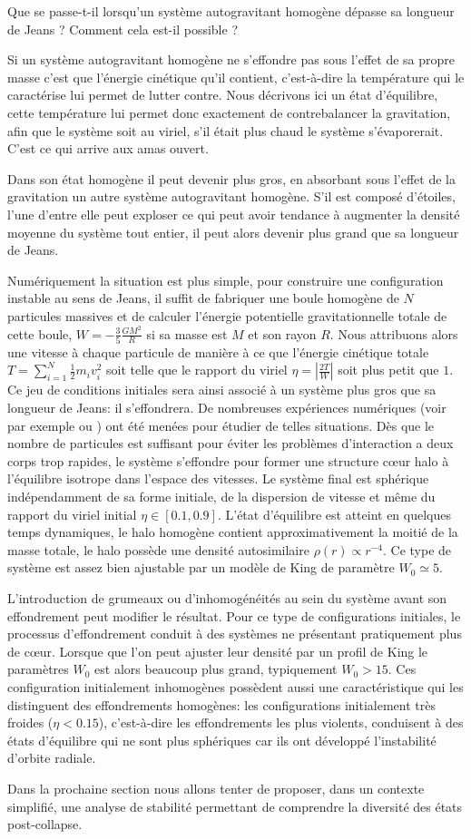 Que se passe-t-il lorsqu'un système autogravitant homogène dépasse sa longueur de Jeans ?
Comment cela est-il possible ?

Si un système autogravitant homogène ne s'effondre pas sous l'effet de sa propre masse c'est que l'énergie cinétique qu'il contient, c'est-à-dire la
température qui le caractérise lui permet de lutter contre. Nous décrivons ici un état d'équilibre, cette température lui permet
donc exactement de contrebalancer la gravitation, afin que le système soit \og au viriel\fg, s'il était plus chaud le système s'évaporerait.
C'est ce qui arrive aux amas ouvert.

Dans son état homogène il peut devenir plus gros, en absorbant sous l'effet de la gravitation un autre système autogravitant homogène. S'il est
composé d'étoiles, l'une d'entre elle peut exploser ce qui peut avoir tendance à augmenter la densité moyenne du système tout entier, il peut alors
devenir plus grand que sa longueur de Jeans.

Numériquement la situation est plus simple, pour construire une configuration instable au sens de Jeans, il suffit de fabriquer une boule homogène de
$N$ particules massives et de calculer l'énergie potentielle gravitationnelle totale de cette boule, $W=-\frac{3}{5}\frac{GM^2}{R}$ si sa masse est
$M$ et son rayon $R$. Nous attribuons alors une vitesse à chaque particule de manière à ce que l'énergie cinétique totale $T=\sum_{i=1}^N\frac{1}{2}m_i
v_i^2$ soit telle que le rapport du viriel $\eta=\left|\frac{2T}{W}\right|$ soit plus petit que $1$. Ce jeu de conditions initiales sera ainsi associé
à un système plus gros que sa longueur de Jeans: il s'effondrera. De nombreuses expériences numériques (voir par exemple \cite{roy} ou
\cite{Joyceetal}) ont été menées pour étudier de telles situations. Dès que le nombre de particules est suffisant pour
éviter les problèmes d'interaction a deux corps trop rapides, le système s'effondre pour former une structure cœur halo à l'équilibre isotrope dans
l'espace des vitesses. Le système final est sphérique indépendamment de sa forme initiale, de la dispersion de vitesse et même du rapport du viriel
initial $\eta\in[0.1, 0.9]$. L'état d'équilibre est atteint en quelques temps dynamiques, le halo homogène contient approximativement la moitié de la
masse totale, le halo possède une densité autosimilaire $\rho(r)\propto r^{-4}$. Ce type de système est assez bien ajustable par un modèle de King de
paramètre $W_0\simeq 5$.

L'introduction de grumeaux ou d'inhomogénéités au sein du système avant son effondrement peut modifier le résultat. Pour ce type de configurations
initiales, le processus d'effondrement conduit à des systèmes ne présentant pratiquement plus de cœur. Lorsque que l'on peut ajuster leur densité
par un profil de King le paramètres $W_0$ est alors beaucoup plus grand, typiquement  $W_0>15$. Ces configuration initialement inhomogènes possèdent
aussi une caractéristique qui les distinguent des effondrements homogènes: les configurations initialement très froides ($\eta<0.15$), c'est-à-dire
les effondrements les plus violents, conduisent à des états d'équilibre qui ne sont plus sphériques car ils ont développé l'instabilité d'orbite
radiale.


Dans la prochaine section nous allons tenter de proposer, dans un contexte simplifié, une analyse de stabilité permettant de comprendre la diversité
des états post-collapse.

